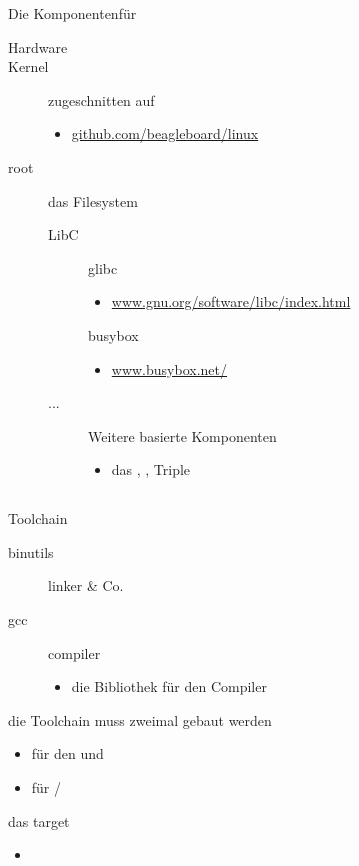 \begin{frame}{Die Komponenten}{für \target}
 \begin{description}
  \item[Hardware] \target
  \item[Kernel] zugeschnitten auf \target
  \begin{itemize}
    \item {\tiny \url{github.com/beagleboard/linux}}
  \end{itemize}	
  \item[root] das Filesystem
  \begin{description}
   \item[LibC] glibc 
   \begin{itemize}
    \item {\tiny \url{www.gnu.org/software/libc/index.html}}
   \end{itemize}	
   \item[\unix] busybox
   \begin{itemize}
    \item {\tiny \url{www.busybox.net/}}
   \end{itemize}
   \item[...] Weitere \unix basierte Komponenten
   \begin{itemize}
    \item das , ,  Triple 
   \end{itemize}
   \end{description}
 \end{description}
\end{frame}

\subsection{\host}
\begin{frame}{Toolchain}
 \begin{description}
  \item[binutils] linker \& Co.
  \item[gcc] compiler
  \begin{itemize}
   \item {} die Bibliothek für den Compiler
  \end{itemize}
 \end{description}
 
 \begin{remarks}
 \item die Toolchain muss zweimal gebaut werden
 \begin{itemize}
  \item für den  und  
  \item für \unix/\posix
 \end{itemize}
 \item das target
 \begin{itemize} 
  \item {}
  
 \end{itemize}
 \end{remarks}
\end{frame}

